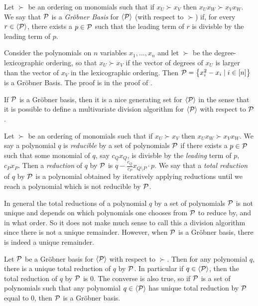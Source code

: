 \begin{definition}\label{def:grobner}
Let $\succ$ be an ordering on monomials such that if $x_U \succ x_V$ then $x_Ux_W \succ x_Vx_W$. We say that $\mathcal P$ is a \emph{Gr\"obner Basis} for $\langle \mathcal P \rangle$ (with respect to $\succ$) if, for every $r \in \langle \mathcal P \rangle$, there exists a $p \in \mathcal P$ such that the leading term of $r$ is divisble by the leading term of $p$.
\end{definition}
\begin{example}\label{ex:grobner}
Consider the polynomials on $n$ variables $x_1,\dots,x_n$ and let $\succ$ be the degree-lexicographic ordering, so that $x_U \succ x_V$ if the vector of degrees of $x_U$ is larger than the vector of $x_V$ in the lexicographic ordering. Then $\mathcal P = \left\{x_i^2 - x_i \mid i \in [n]\right\}$ is a Gr\"obner Basis. The proof is in the proof of .
\end{example}
If $\mathcal P$ is a Gr\"obner basis, then it is a nice generating set for $\langle \mathcal P \rangle$ in the sense that it is possible to define a multivariate division algorithm for $\langle \mathcal P \rangle$ with respect to $\mathcal P$. 
\begin{definition}
Let $\succ$ be an ordering of monomials such that if $x_U \succ x_V$ then $x_Ux_W \succ x_Vx_W$. We say a polynomial $q$ is \emph{reducible} by a set of polynomials $\mathcal P$ if there exists a $p \in \mathcal P$ such that some monomial of $q$, say $c_Qx_Q$, is divisble by the \emph{leading} term of $p$, $c_Px_P$. Then a \emph{reduction} of $q$ by $\mathcal P$ is $q - \frac{c_Q}{c_P}x_{Q \setminus P} \cdot p$. We say that a \emph{total reduction} of $q$ by $\mathcal P$ is a polynomial obtained by iteratively applying reductions until we reach a polynomial which is not reducible by $\mathcal P$. 
\end{definition}
In general the total reductions of a polynomial $q$ by a set of polynomials $\mathcal P$ is not unique and depends on which polynomials one chooses from $\mathcal P$ to reduce by, and in what order. So it does not make much sense to call this a division algorithm since there is not a unique remainder. However, when $\mathcal P$ is a Gr\"obner basis, there is indeed a unique remainder.
\begin{proposition}\label{prop:grobner-unique}
Let $\mathcal P$ be a Gr\"obner basis for $\langle \mathcal P \rangle$ with respect to $\succ$. Then for any polynomial $q$, there is a unique total reduction of $q$ by $\mathcal P$. In particular if $q \in \langle \mathcal P \rangle$, then the total reduction of $q$ by $\mathcal P$ is $0$. The converse is also true, so if $\mathcal P$ is a set of polynomials such that any polynomial $q \in \langle \mathcal P \rangle$ has unique total reduction by $\mathcal P$ equal to $0$, then $\mathcal P$ is a Gr\"obner basis. 
\end{proposition}
